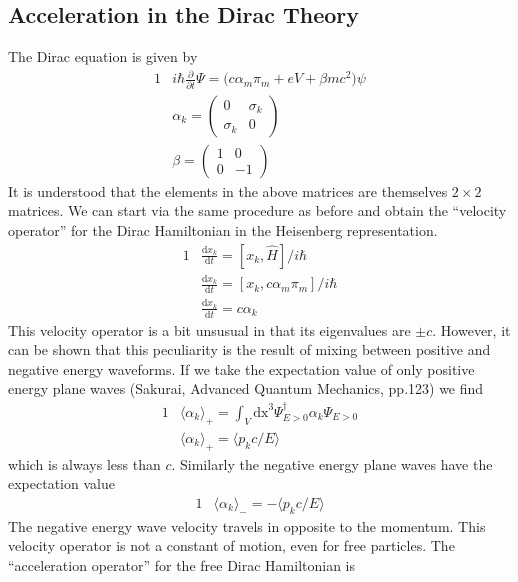 \documentclass[]{article}
\numberwithin{equation}{subsection}
\begin{document}
\subsection{Acceleration in the Dirac Theory}
The Dirac equation is given by
\begin{alignat}{1}
  \label{m32}		&i\hbar\frac{\partial}{\partial t}\Psi=\Big(c\alpha_{m}\pi_{m}+eV+\beta mc^{2}\Big)\psi\\
  \label{m33}		&\alpha_{k}=
  \begin{pmatrix}
    0&\sigma_{k}\\
    \sigma_{k}&0
  \end{pmatrix}\\
  \label{m34}		&\beta=
  \begin{pmatrix}
    1&0\\
    0&-1
  \end{pmatrix}
\end{alignat}
It is understood that the elements in the above matrices are themselves $2\times2$ matrices. We can start via the same procedure as before and obtain the ``velocity operator'' for the Dirac Hamiltonian in the Heisenberg representation.
\begin{alignat}{1}
  \label{m35}		&\frac{\mathrm{d}x_{k}}{\mathrm{d}t}=[x_{k},\hat{H}]/i\hbar\\
  \label{m36}		&\frac{\mathrm{d}x_{k}}{\mathrm{d}t}=[x_{k},c\alpha_{m}\pi_{m}]/i\hbar\\
  \label{m37}            &\frac{\mathrm{d}x_{k}}{\mathrm{d}t}=c\alpha_{k}
\end{alignat}
This velocity operator is a bit unsusual in that its eigenvalues are $\pm c$. However, it can be shown that this peculiarity is the result of mixing between positive and negative energy waveforms. If we take the expectation value of only positive energy plane waves (Sakurai, Advanced Quantum Mechanics, pp.123) we find
\begin{alignat}{1}
  \label{m38}		&\langle\alpha_{k}\rangle_{+}=\int_{V}\mathrm{dx}^{3}\Psi^{\dagger}_{E>0}\alpha_{k}\Psi_{E>0}\\
  \label{m39}		&\langle\alpha_{k}\rangle_{+}=\langle p_{k}c/E\rangle
\end{alignat}
which is always less than $c$. Similarly the negative energy plane waves have the expectation value
\begin{alignat}{1}
  \label{m40}		&\langle\alpha_{k}\rangle_{-}=-\langle p_{k}c/E\rangle
\end{alignat}
The negative energy wave velocity travels in opposite to the momentum. This velocity operator is not a constant of motion, even for free particles. The ``acceleration operator'' for the free Dirac Hamiltonian is
\end{document}

